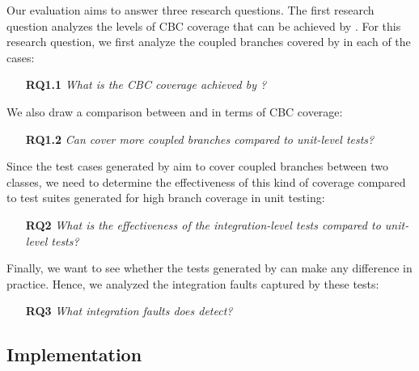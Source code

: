 Our evaluation aims to answer three research questions.
The first research question analyzes the levels of CBC coverage that can be achieved by \cling. 
For this research question, we first analyze the coupled branches covered by \cling in each of the cases:
\begin{itemize}
		\item[\textbf{RQ1.1}] \textit{What is the CBC coverage achieved by \cling? }
\end{itemize}
We also draw a comparison between \cling and \evosuite in terms of CBC coverage:
\begin{itemize}
		\item[\textbf{RQ1.2}] \textit{Can \cling cover more coupled branches compared to unit-level tests? }
\end{itemize}
Since the test cases generated by \cling aim to cover coupled branches between two classes, we need to determine the effectiveness of this kind of coverage compared to test suites generated for high branch coverage in unit testing:
\begin{itemize}
	\item[\textbf{RQ2}\phantom{y}] \textit{What is the effectiveness of the integration-level tests compared to unit-level tests?}
\end{itemize} 
Finally, we want to see whether the tests generated by \cling can make any difference in practice. Hence, we analyzed the integration faults captured by these tests:
\begin{itemize}
	\item[\textbf{RQ3}\phantom{y}] \textit{What integration faults does \cling detect?}
\end{itemize}

\subsection{Implementation}
\label{sec:implementation}

